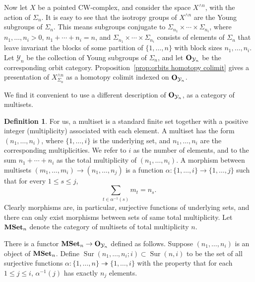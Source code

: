 \documentclass[psamsfonts]{amsart}
\theoremstyle{plain}
\theoremstyle{definition}
\newtheorem{defn}[thm]{Definition}
\theoremstyle{remark}
\newcommand{\catname}[1]{{\normalfont\textbf{#1}}}
\newcommand{\mset}{\catname{MSet}}
\newcommand{\orbit}{\catname{O}}
\DeclareMathOperator{\sur}{Sur}
\begin{document}
Now let $X$ be a pointed CW-complex, and consider the space $X^{\wedge n}$, with the action of $\Sigma_n$. It is easy to see that the isotropy groups of $X^{\wedge n}$ are the Young subgroups of $\Sigma_n$. This means subgroups conjugate to $\Sigma_{n_1}\times \cdots \times \Sigma_{n_i}$, where $n_1, \ldots, n_i>0$, $n_1+\cdots +n_i=n$, and $\Sigma_{n_1}\times \cdots \times \Sigma_{n_i}$ consists of elements of $\Sigma_n$ that leave invariant the blocks of some partition of $\{1, \ldots, n\}$ with block sizes $n_1, \ldots, n_i$. Let ${\mathcal Y}_n$ be the collection of Young subgroups of $\Sigma_n$, and let $\orbit_{{\mathcal Y}_n}$ be the corresponding orbit category. Proposition~\ref{prop:orbits homotopy colimit} gives a presentation of $X^{\wedge n}_{\Sigma_n}$ as a homotopy colimit indexed on $\orbit_{{\mathcal Y}_n}$.

We find it convenient to use a different description of $\orbit_{{\mathcal Y}_n}$, as a category of multisets.
\begin{defn}
 For us, a multiset is a standard finite set together with a positive integer (multiplicity) associated with each element. A multiset has the form $(n_1, \ldots, n_i)$, where $\{1, \ldots, i\}$ is the underlying set, and $n_1, \ldots, n_i$ are the corresponding multiplicities. We refer to $i$ as the number of elements, and to the sum $n_1+\cdots+n_i$ as the total multiplicity of $(n_1, \ldots, n_i)$. A morphism between multisets $(m_1, \ldots, m_i)\to (n_1,\ldots, n_j)$ is a function $\alpha\colon\{1, \ldots, i\}\to \{1, \ldots, j\}$ such that for every $1\le s \le j$,
 \[
 \sum_{t\in \alpha^{-1}(s)}m_t=n_s.
 \]
Clearly morphisms are, in particular, surjective functions of underlying sets, and there can only exist morphisms between sets of same total multiplicity. Let $\mset_n$ denote the category of multisets of total multiplicity $n$.
\end{defn}
There is a functor $\mset_n\to \orbit_{{\mathcal Y}_n}$ defined as follows. Suppose $(n_1, \ldots, n_i)$ is an object of $\mset_n$. Define $\sur(n_1, \ldots, n_i; i)\subset \sur(n, i)$ to be the set of all surjective functions $\alpha\colon \{1, \ldots, n\}\twoheadrightarrow \{1, \ldots, i\}$ with the property that for each $1\le j\le i$, $\alpha^{-1}(j)$ has exactly $n_j$ elements.
\end{document}
